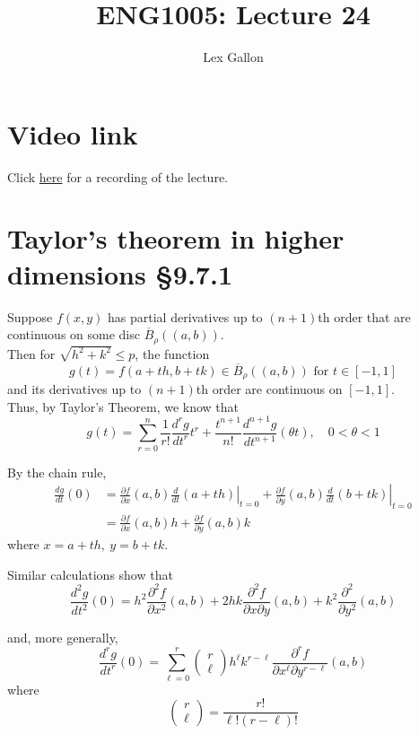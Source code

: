 \documentclass[11pt]{article}
\begin{document}
\title{ENG1005: Lecture 24}
\author{Lex Gallon}
\maketitle

\tableofcontents

\section*{Video link}
Click \href{https://echo360.org.au/lesson/G_35fe23e0-41ee-4e6f-b0f5-05f4155bb7b0_b944cecf-8ba5-40d3-a870-0243a0a9e78c_2020-05-14T15:58:00.000_2020-05-14T16:53:00.000/classroom#sortDirection=desc}{here} for a recording of the lecture.

\section{Taylor's theorem in higher dimensions §9.7.1}
Suppose $f(x, y)$ has partial derivatives up to $(n+1)$th order that are continuous on some disc $\overline{B}_\rho((a, b))$.\\
Then for $\sqrt{h^2 + k^2} \leq p$, the function
\[ g(t) = f(a + th, b + tk) \in \overline{B}_\rho((a, b)) \text{ for } t \in [-1, 1] \]
and its derivatives up to $(n+1)$th order are continuous on $[-1, 1]$.\\
Thus, by Taylor's Theorem, we know that
\[ g(t) = \sum_{r=0}^n \frac{1}{r!} \frac{d^rg}{dt^r	}t^r + \frac{t^{n+1}}{n!} \frac{d^{n+1}g}{dt^{n+1}}(\theta t), \quad 0 < \theta < 1 \]

By the chain rule,
\begin{align*}
\frac{dg}{dt}(0) &= \left. \frac{\partial f}{\partial x}(a, b) \frac{d}{dt}(a + th) \right|_{t=0} + \left. \frac{\partial f}{\partial y}(a, b) \frac{d}{dt}(b + tk) \right|_{t=0} \\
&= \frac{\partial f}{\partial x}(a, b)h + \frac{\partial f}{\partial y}(a, b) k
\end{align*}
where $x = a+th,\ y = b + tk$.

Similar calculations show that
\[ \frac{d^2g}{dt^2}(0) = h^2 \frac{\partial^2 f}{\partial x^2}(a, b) + 2hk \frac{\partial^2 f}{\partial x \partial y}(a, b) + k^2 \frac{\partial^2}{\partial y^2}(a, b) \]

and, more generally,
\[ \frac{d^rg}{dt^r}(0) = \sum_{\ell=0}^r \begin{pmatrix}
r \\
\ell
\end{pmatrix}
h^\ell k^{r-\ell} \frac{\partial^r f}{\partial x^\ell \partial y^{r-\ell}}(a, b)
\]
where
\[ \begin{pmatrix}
r \\
\ell
\end{pmatrix}
= \frac{r!}{\ell!(r-\ell)!}
\]
\end{document}
